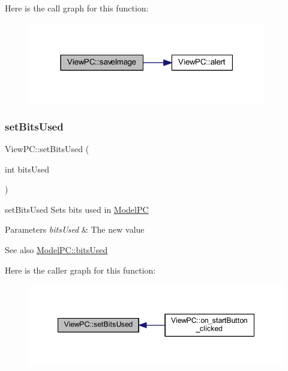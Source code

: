 Here is the call graph for this function\+:
\nopagebreak
\begin{figure}[H]
\begin{center}
\leavevmode
\includegraphics[width=295pt]{class_view_p_c_a7901ce10ffaaf2387bef1db7feea342d_cgraph}
\end{center}
\end{figure}
\mbox{\label{class_view_p_c_a2ccc0a3f2f48080ae6308e800646fcd5}} 
\subsubsection{\texorpdfstring{set\+Bits\+Used}{setBitsUsed}}
{\footnotesize\ttfamily View\+P\+C\+::set\+Bits\+Used (\begin{DoxyParamCaption}\item[{int}]{bits\+Used }\end{DoxyParamCaption})\hspace{0.3cm}{\ttfamily [signal]}}



set\+Bits\+Used Sets bits used in \mbox{\hyperlink{class_model_p_c}{Model\+PC}} 


\begin{DoxyParams}{Parameters}
{\em bits\+Used} & The new value \\
\hline
\end{DoxyParams}
\begin{DoxySeeAlso}{See also}
\mbox{\hyperlink{class_model_p_c_a655deb6a8afa94c7f4aadb3056989038}{Model\+P\+C\+::bits\+Used}} 
\end{DoxySeeAlso}
Here is the caller graph for this function\+:
\nopagebreak
\begin{figure}[H]
\begin{center}
\leavevmode
\includegraphics[width=347pt]{class_view_p_c_a2ccc0a3f2f48080ae6308e800646fcd5_icgraph}
\end{center}
\end{figure}
\mbox{\label{class_view_p_c_a5b48951efefdc0e3039c9a4bf185320b}} 
